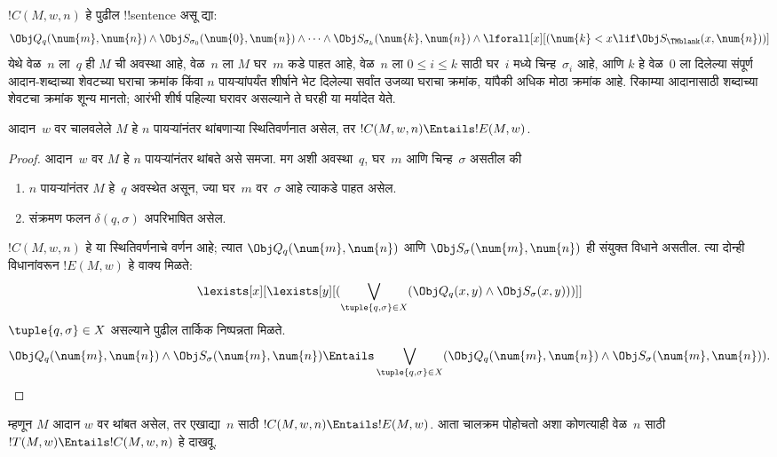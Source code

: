 \documentclass[../../../include/open-logic-section]{subfiles}
\begin{document}
\begin{defn} 
$!C(M, w, n)$ हे पुढील
!!{sentence} असू द्या:
\[ 
\Obj Q_q(\num{m}, \num{n}) \land \Obj S_{\sigma_0}(\num{0}, \num{n})
\land \dots \land \Obj S_{\sigma_k}(\num{k}, \num{n}) \land
\lforall[x][(\num{k} < x \lif \Obj S_\TMblank(x, \num{n}))]
\] 
येथे वेळ~$n$ ला~$q$
ही $M$ ची अवस्था आहे,
वेळ~$n$ ला $M$ घर~$m$
कडे पाहत आहे, वेळ~$n$
ला $0 \le i \le k$
साठी घर~$i$ मध्ये
चिन्ह~$\sigma_i$ आहे,
आणि $k$ हे वेळ~$0$
ला दिलेल्या संपूर्ण आदान-शब्दाच्या शेवटच्या
घराचा क्रमांक किंवा $n$ पायऱ्यांपर्यंत
शीर्षाने भेट दिलेल्या सर्वांत उजव्या
घराचा क्रमांक, यांपैकी अधिक मोठा क्रमांक आहे.
रिकाम्या आदानासाठी शब्दाच्या शेवटचा क्रमांक
शून्य मानतो; आरंभी शीर्ष पहिल्या घरावर असल्याने
ते घरही या मर्यादेत येते.
%
\end{defn}

\begin{lem}
आदान~$w$ वर चालवलेले $M$
हे $n$ पायऱ्यांनंतर
थांबणाऱ्या स्थितिवर्णनात
असेल, तर $!C(M, w, n) \Entails !E(M, w)$.
\end{lem}

\begin{proof}
आदान~$w$ वर $M$ हे $n$
पायऱ्यांनंतर थांबते असे
समजा. मग अशी अवस्था~$q$,
घर~$m$ आणि चिन्ह~$\sigma$
असतील की
\begin{enumerate} 
\item $n$ पायऱ्यांनंतर $M$
  हे~$q$ अवस्थेत असून,
  ज्या घर~$m$ वर~$\sigma$
  आहे त्याकडे पाहत असेल.
\item संक्रमण फलन $\delta(q, \sigma)$
  अपरिभाषित असेल.
\end{enumerate}
$!C(M, w, n)$ हे या
स्थितिवर्णनाचे वर्णन आहे;
त्यात $\Obj Q_{q}(\num{m}, \num{n})$
आणि $\Obj
S_{\sigma}(\num{m}, \num{n})$
ही संयुक्त विधाने असतील.
त्या दोन्ही विधानांवरून
$!E(M, w)$ हे वाक्य मिळते:
\[
\lexists[x][\lexists[y][(\bigvee_{\tuple{q, \sigma} \in
      X}(\Obj Q_q(x, y) \land \Obj S_\sigma(x, y)))]]
\]
$\tuple{q,\sigma} \in X$ असल्याने पुढील तार्किक निष्पन्नता मिळते.
\[
  \Obj Q_{q}(\num{m}, \num{n}) \land \Obj S_{\sigma}(\num{m}, \num{n})
  \Entails \bigvee_{\tuple{q, \sigma} \in X}
  (\Obj Q_q(\num{m}, \num{n}) \land \Obj S_{\sigma}(\num{m}, \num{n})).
\]
%
\end{proof}

\begin{explain}
म्हणून $M$ आदान $w$
वर थांबत असेल, तर
एखाद्या~$n$ साठी
$!C(M,
w, n) \Entails !E(M,w)$.
आता चालक्रम पोहोचतो अशा कोणत्याही वेळ~$n$
साठी $!T(M, w) \Entails !C(M, w, n)$
हे दाखवू.
\end{explain}
\end{document}
